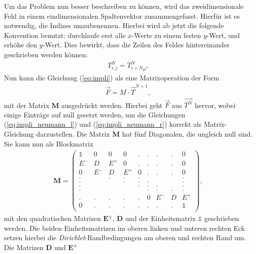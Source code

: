 \documentclass[12pt,a4paper,titlepage,headinclude,bibtotoc]{scrartcl}
\begin{document}
Um das Problem nun besser beschreiben zu können, wird das zweidimensionale Feld in einem eindimensionalen Spaltenvektor zusammengefasst. Hierfür ist es notwendig, die Indizes umzubenennen. Hierbei wird ab jetzt die folgende Konvention benutzt: durchlaufe erst alle $x$-Werte zu einem festen $y$-Wert, und erhöhe den $y$-Wert. Dies bewirkt, dass die Zeilen des Feldes hintereinander geschrieben werden können:
\begin{align*}
T_{i,j}^{N} = T_{i+N_y j}^{N}.
\end{align*}
Nun kann die Gleichung (\ref{eq:impli}) als eine Matrixoperation der Form
\begin{align*}
\vec{F} = M \cdot \vec{T}^{N+1},
\end{align*} 
mit der Matrix \textbf{M} ausgedrückt werden. Hierbei geht $\vec{F}$ aus $\vec{T^N}$ hervor, wobei einige Einträge auf null gesetzt werden, um die Gleichungen (\ref{eq:impli_neumann_l}) und (\ref{eq:impli_neumann_r}) korrekt als Matrix-Gleichung darzustellen.
Die Matrix \textbf{M} hat fünf Diagonalen, die ungleich null sind. Sie kann nun als Blockmatrix
\begin{align*}
\boldsymbol{M} = \begin{pmatrix}
  \mathds{1}  & 0 & 0 &  0 & . & . & . & . & 0 \\
  E^-  & D & E^+ &  0 & . & . & . & . & 0 \\
  0  & E^- & D & E^+ & 0 &  . & . & . & 0\\
  . & & . & . & . & & & &  . \\
  . & & & . & . & . & & &  . \\
  . & & & &  . & . & . & &  . \\
  . & &  & & &  . & . & . &  . \\
  .  & . & . & . & . & 0 & E^- & D & E^+ \\
  0  & . & . & . & . & . & . & . & \mathds{1} \\
 \end{pmatrix}
,
\end{align*}
mit den quadratischen Matrizen $\textbf{E}^\pm$, \textbf{D} und der Einheitsmatrix $\mathds{1}$ geschrieben werden. Die beiden Einheitsmatrizen im oberen linken und unteren rechten Eck setzen hierbei die \textit{Dirichlet}-Randbedingungen am oberen und rechten Rand um.
Die Matrizen \textbf{D} und $\textbf{E}^\pm$ 
\end{document}
